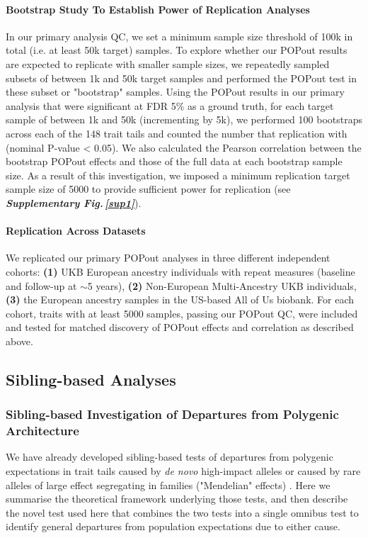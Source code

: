 \documentclass[12pt]{zHenriquesLab-StyleBioRxiv}
\newcommand\sref[1]{\normalsize{\textbf{\textit{Supplementary Fig.\,\ref{#1}}}}\normalsize{}}
\begin{document}
\paragraph{Bootstrap Study To Establish Power of Replication Analyses}
In our primary analysis QC, we set a minimum sample size threshold of 100k in total 
(i.e. at least 50k target) samples. To explore whether our POPout results are expected 
to replicate with smaller sample sizes, we repeatedly sampled subsets of between 1k and 50k 
target samples and performed the POPout test in these subset or "bootstrap" samples. 
Using the POPout results in our primary analysis that were significant at FDR 5\% as a ground 
truth, for each target sample of between 1k and 50k (incrementing by 5k), 
we performed 100 bootstraps across each of the 148 trait tails and counted 
the number that replication with (nominal P-value < 0.05). 
We also calculated the Pearson correlation between the bootstrap 
POPout effects and those of the full data at each bootstrap sample size. As a result of 
this investigation, we imposed a minimum replication target sample size of 5000 to 
provide sufficient power for replication (see \sref{sup1}). 


\paragraph{Replication Across Datasets} 
We replicated our primary POPout analyses in three different independent cohorts:  
\textbf{(1)} UKB European ancestry individuals with repeat measures (baseline and follow-up at $\sim$5 years), 
\textbf{(2)} Non-European Multi-Ancestry UKB individuals, \textbf{(3)} the European ancestry samples in the 
US-based All of Us biobank. For each cohort, traits with at least 5000 samples, passing our POPout QC, 
were included and tested for matched discovery of POPout effects and correlation as described above. 
%
\subsection*{Sibling-based Analyses} \label{sec:methods:sibs}  
%
\subsubsection*{Sibling-based Investigation of Departures from Polygenic Architecture}
We have already developed sibling-based tests of departures from polygenic expectations 
in trait tails caused by \emph{de novo} high-impact alleles or caused by rare alleles of 
large effect segregating in families ("Mendelian" effects) \cite{Souaiaia2024}. Here we 
summarise the theoretical framework underlying those tests, and then describe the novel 
test used here that combines the two tests into a single omnibus test to identify general 
departures from population expectations due to either cause.
\end{document}
